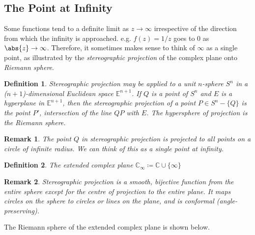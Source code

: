\documentclass{article}
\theoremstyle{plain}\theoremheaderfont{\normalfont\itshape}\theorembodyfont{\rmfamily}\theoremseparator{.}\newtheorem*{rem}{Remark}\newtheorem*{ex}{Example}\newtheorem*{proof}{Proof}\newtheorem*{altp}{Alternative proof}
\theoremstyle{plain}\theoremheaderfont{\normalfont\bfseries}\theorembodyfont{\rmfamily}\theoremseparator{.}\newtheorem{thm}{Theorem}[section]\newtheorem{lem}[thm]{Lemma}\newtheorem{prop}[thm]{Proposition}\newtheorem*{cor}{Corollary}\newtheorem{defn}[thm]{Definition}\newtheorem{clm}[thm]{Claim}\newtheorem{clminproof}{Claim}
\theoremstyle{break}\theoremheaderfont{\normalfont\itshape}\theorembodyfont{\rmfamily}\theoremseparator{.\medskip}\newtheorem*{proofskip}{Proof}\newtheorem*{exs}{Examples}\newtheorem*{rems}{Remarks}
\theoremstyle{break}\theoremheaderfont{\normalfont\bfseries}\theorembodyfont{\rmfamily}\theoremseparator{.\medskip}\newtheorem{lemskip}[thm]{Lemma}\newtheorem{defnskip}[thm]{Definition}\newtheorem{propskip}[thm]{Proposition}\newtheorem{thmskip}[thm]{Theorem}
\numberwithin{equation}{section}
\begin{document}
	\subsection{The Point at Infinity}
	Some functions tend to a definite limit as \(z\to\infty\) irrespective of the direction from which the infinity is approached. e.g. \(f(z)=1/z\) goes to 0 as \(\abs{z}\to\infty\). Therefore, it sometimes makes sense to think of \(\infty\) as a single point, as illustrated by the \textit{stereographic projection} of the complex plane onto \textit{Riemann sphere}.
	\begin{defn}
		\textit{Stereographic projection} may be applied to a unit \(n\)-sphere \(S^n\) in a (\(n+1\))-dimensional Euclidean space \(\mathbb{E}^{n+1}\). If \(Q\) is a point of \(S^n\) and \(E\) is a hyperplane in \(\mathbb{E}^{n+1}\), then the stereographic projection of a point \(P\in S^n-\{Q\}\) is the point \(P'\), intersection of the line \(QP\) with \(E\). The hypersphere of projection is the \textit{Riemann sphere}.
	\end{defn}
	\begin{rem}
		The point \(Q\) in stereographic projection is projected to all points on a circle of infinite radius. We can think of this as a single \textit{point at infinity}.
	\end{rem}
	\begin{defn}
		The \textit{extended complex plane} \(\mathbb{C}_\infty\coloneqq\mathbb{C}\cup\{\infty\}\)
	\end{defn}
	\begin{rem}
		Stereographic projection is a smooth, bijective function from the entire sphere except for the centre of projection to the entire plane. It maps circles on the sphere to circles or lines on the plane, and is conformal (angle-preserving).
	\end{rem}

	The Riemann sphere of the extended complex plane is shown below.

	\begin{figure}[ht!]
		\centering
	\end{figure}
\end{document}
